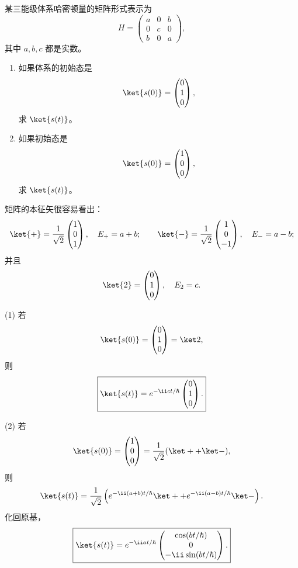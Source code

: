 \begin{question}
某三能级体系哈密顿量的矩阵形式表示为
\[
H=\begin{pmatrix}
a&0&b\\
0&c&0\\
b&0&a
\end{pmatrix},
\]
其中 $a,b,c$ 都是实数。
\begin{enumerate}
\item 如果体系的初始态是
\[
\ket{s(0)}=\begin{pmatrix}0\\1\\0\end{pmatrix},
\]
求 $\ket{s(t)}$。
\item 如果初始态是
\[
\ket{s(0)}=\begin{pmatrix}1\\0\\0\end{pmatrix},
\]
求 $\ket{s(t)}$。
\end{enumerate}
\end{question}
\begin{solution}
矩阵的本征矢很容易看出：
\[
\ket{+}=\frac1{\sqrt2}\begin{pmatrix}1\\0\\1\end{pmatrix},
\quad E_+=a+b;
\qquad
\ket{-}=\frac1{\sqrt2}\begin{pmatrix}1\\0\\-1\end{pmatrix},
\quad E_-=a-b;
\]
并且
\[
\ket{2}=\begin{pmatrix}0\\1\\0\end{pmatrix},
\quad E_2=c.
\]

(1) 若
\[
\ket{s(0)}=\begin{pmatrix}0\\1\\0\end{pmatrix}=\ket2,
\]
则
\[
\boxed{\ket{s(t)}=e^{-\ii ct/\hbar}\begin{pmatrix}0\\1\\0\end{pmatrix}.}
\]

(2) 若
\[
\ket{s(0)}=\begin{pmatrix}1\\0\\0\end{pmatrix}
=\frac1{\sqrt2}(\ket+ +\ket-),
\]
则
\[
\ket{s(t)}=\frac1{\sqrt2}\left(e^{-\ii(a+b)t/\hbar}\ket+
+e^{-\ii(a-b)t/\hbar}\ket-\right).
\]
化回原基，
\[
\boxed{\ket{s(t)}=e^{-\ii at/\hbar}
\begin{pmatrix}
\cos(bt/\hbar)\\0\\-\ii\sin(bt/\hbar)
\end{pmatrix}.}
\]
\end{solution}

